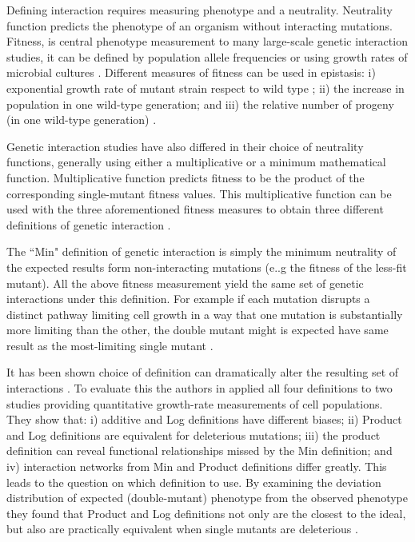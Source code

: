 Defining interaction requires measuring phenotype and a neutrality.
Neutrality function predicts the phenotype of an organism without interacting mutations. 
Fitness, is central phenotype measurement to many large-scale genetic interaction studies, it can be defined by population allele frequencies or using growth rates of microbial cultures \cite{mani2008defining}. 
Different measures of fitness can be used in epistasis: i) exponential growth rate of mutant strain respect to wild type ; ii) the increase in population in one wild-type generation; and iii) the relative number of progeny (in one wild-type generation) \cite{mani2008defining}.

Genetic interaction studies have also differed in their choice of neutrality functions, generally using either a multiplicative or a minimum mathematical function. Multiplicative function predicts fitness to be the product of the corresponding single-mutant fitness values. This multiplicative function can be used with the three aforementioned fitness measures to obtain three different definitions of genetic interaction \cite{mani2008defining}.

The ``Min" definition of genetic interaction is simply the minimum neutrality of the expected results form non-interacting mutations (e..g the fitness of the less-fit mutant). 
All the above fitness measurement yield the same set of genetic interactions under this definition. 
For example if each mutation disrupts a distinct pathway limiting cell growth in a way that one mutation is substantially more limiting than the other, the double mutant might is expected have same result as the most-limiting single mutant \cite{mani2008defining}.

It has been shown choice of definition can dramatically alter the resulting set of interactions \cite{mani2008defining}.
To evaluate this the authors in \cite{mani2008defining} applied all four definitions to two studies providing quantitative growth-rate measurements of cell populations. 
They show that: 
i) additive and Log definitions have different biases; 
ii) Product and Log definitions are equivalent for deleterious mutations; 
iii) the product definition can reveal functional relationships missed by the Min definition; 
and iv) interaction networks from Min and Product definitions differ greatly. 
This leads to the question on which definition to use. 
By examining the deviation distribution of expected (double-mutant) phenotype from the observed phenotype they found that Product and Log definitions not only are the closest to the ideal, but also are practically equivalent when single mutants are deleterious \cite{mani2008defining}.

